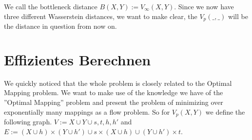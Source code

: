 \documentclass[11pt, a4paper,draft]{report}
\begin{document}
We call the bottleneck distance $B(X,Y) := V_\infty(X,Y)$. Since we now have three different Wasserstein distances, we want to make clear, the $V_p(\_,\_)$ will be the distance in question from now on. 
 	
 	\section{Effizientes Berechnen}
 	
We quickly noticed that the whole problem is closely related to the Optimal Mapping problem. We want to make use of the knowledge we have of the ''Optimal Mapping'' problem and present the problem of minimizing over exponentially many mappings as a flow problem. So for $V_p(X,Y)$ we define the following graph. $V := X\cup Y\cup {s,t,h,h'}$ and $E := (X\cup h)\times (Y\cup h') \cup {s}\times (X\cup h) \cup (Y\cup h')\times t$.\\\
\end{document}
